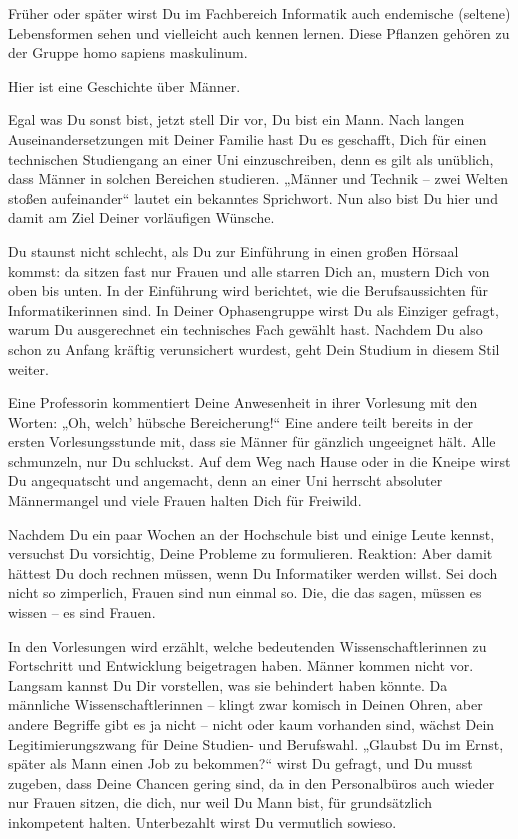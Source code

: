{Früher oder später wirst Du im Fachbereich Informatik auch endemische (seltene) Lebensformen sehen und vielleicht auch kennen lernen. Diese Pflanzen gehören zu der Gruppe homo sapiens maskulinum.
}{Hier ist eine Geschichte über Männer.

Egal was Du sonst bist, jetzt stell Dir vor, Du bist ein Mann. Nach langen Auseinandersetzungen mit Deiner Familie hast Du es geschafft, Dich für einen technischen Studiengang an einer Uni einzuschreiben, denn es gilt als unüblich, dass Männer in solchen Bereichen studieren. „Männer und Technik – zwei Welten stoßen aufeinander“ lautet ein bekanntes Sprichwort. Nun also bist Du hier und damit am Ziel Deiner vorläufigen Wünsche.

Du staunst nicht schlecht, als Du zur Einführung in einen großen Hörsaal kommst: da sitzen fast nur Frauen und alle starren Dich an, mustern Dich von oben bis unten. In der Einführung wird berichtet, wie die Berufsaussichten für Informatikerinnen sind. In Deiner Ophasengruppe wirst Du als Einziger gefragt, warum Du ausgerechnet ein technisches Fach gewählt hast. Nachdem Du also schon zu Anfang kräftig verunsichert wurdest, geht Dein Studium in diesem Stil weiter. 

Eine Professorin kommentiert Deine Anwesenheit in ihrer Vorlesung mit den Worten: „Oh, welch' hübsche Bereicherung!“ Eine andere teilt bereits in der ersten Vorlesungsstunde mit, dass sie Männer für gänzlich ungeeignet hält. Alle schmunzeln, nur Du schluckst. Auf dem Weg nach Hause oder in die Kneipe wirst Du angequatscht und angemacht, denn an einer Uni herrscht absoluter Männermangel und viele Frauen halten Dich für Freiwild. 

Nachdem Du ein paar Wochen an der Hochschule bist und einige Leute kennst, versuchst Du vorsichtig, Deine Probleme zu formulieren. Reaktion: Aber damit hättest Du doch rechnen müssen, wenn Du Informatiker werden willst. Sei doch nicht so zimperlich, Frauen sind nun einmal so. Die, die das sagen, müssen es wissen – es sind Frauen.

In den Vorlesungen wird erzählt, welche bedeutenden Wissenschaftlerinnen zu Fortschritt und Entwicklung beigetragen haben. Männer kommen nicht vor. Langsam kannst Du Dir vorstellen, was sie behindert haben könnte. Da männliche Wissenschaftlerinnen – klingt zwar komisch in Deinen Ohren, aber andere Begriffe gibt es ja nicht – nicht oder kaum vorhanden sind, wächst Dein Legitimierungszwang für Deine Studien- und Berufswahl. „Glaubst Du im Ernst, später als Mann einen Job zu bekommen?“ wirst Du gefragt, und Du musst zugeben, dass Deine Chancen gering sind, da in den Personalbüros auch  wieder nur Frauen sitzen, die dich, nur weil Du Mann bist, für grundsätzlich inkompetent halten. Unterbezahlt wirst Du vermutlich sowieso. 

}
